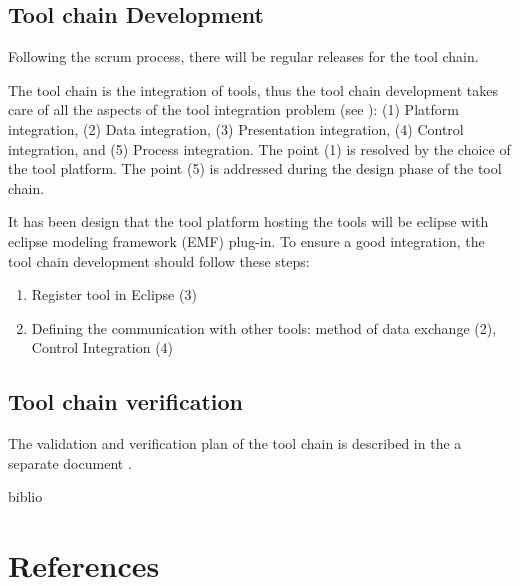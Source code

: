 \documentclass{openetcs_article}
\begin{document}
\subsection{Tool chain Development}
Following the scrum process, there will be regular releases for the tool chain.

The tool chain is the integration of  tools, thus the tool chain development
takes care of all the aspects of the tool integration problem (see  
\cite{wasserman_tool_1990}): (1) Platform integration, (2) Data integration,
(3) Presentation integration, (4) Control integration, and (5) Process
integration.
The point (1) is resolved by the choice of the tool platform. The point (5) is
addressed during the design phase of the tool chain.

It has been design that the tool platform hosting the tools will be
eclipse with eclipse modeling framework (\gls{EMF}) plug-in. 
To ensure a good  integration, the tool chain development should follow these steps:
\begin{enumerate}
\item Register tool in Eclipse (3)
\item Defining the communication with other tools: method of data exchange (2),
  Control Integration (4)
\end{enumerate}




\subsection{Tool chain  verification}
The validation and verification plan of the tool chain is described in the
a separate  document \cite{}.



\begin{btSect}{biblio}
\section{References}
\btPrintAll
\end{btSect}


\appendix






\end{document}
